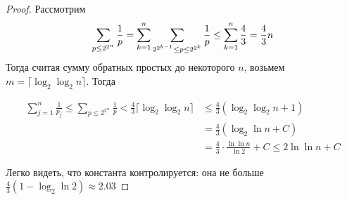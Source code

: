 \begin{enumerate}
\begin{proof}
        Рассмотрим
        \begin{gather*}
            \sum_{p \leq 2^{2^n}} \frac{1}{p} = \sum \limits_{k=1}^n \sum_{2^{2^{k-1}} \leq p \leq 2^{2^k}} \frac{1}{p}
            \leq \sum \limits_{k=1}^n \frac{4}{3} = \frac{4}{3}n
        \end{gather*}
        Тогда считая сумму обратных простых до некоторого $n$, возьмем $m = \lceil \log_2 \log_2 n \rceil$. Тогда

        \begin{align*}
            \sum_{j=1}^n \frac{1}{p_j} \leqslant \sum_{p \leqslant 2^{2^m}} \frac{1}{p} < \frac{4}{3}\lceil \log_2 \log_2 n \rceil
            &\leqslant \frac{4}{3} (\log_2 \log_2 n + 1) \\
            &= \frac{4}{3}(\log_2 \ln n + C) \\
            &= \frac{4}{3} \cdot \frac{\ln \ln n}{\ln 2} + C \leq 2 \ln \ln n + C
        \end{align*}

        Легко видеть, что константа контролируется: она не больше $\frac{4}{3} (1 - \log_2 \ln 2) \approx 2.03$
    \end{proof}   


\end{enumerate}